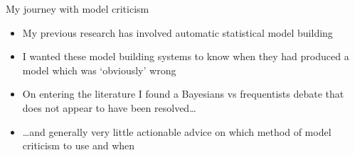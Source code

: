\begin{frame}{My journey with model criticism}
  \begin{itemize}
    \item My previous research has involved automatic statistical model building
    \vspace{\baselineskip}
    \pause
    \item I wanted these model building systems to know when they had produced a model which was `obviously' wrong
    \vspace{\baselineskip}
    \pause
    \item On entering the literature I found a Bayesians vs frequentists debate that does not appear to have been resolved\dots
    \vspace{\baselineskip}
    \pause
    \item \dots and generally very little actionable advice on which method of model criticism to use and when
  \end{itemize}
\end{frame}

